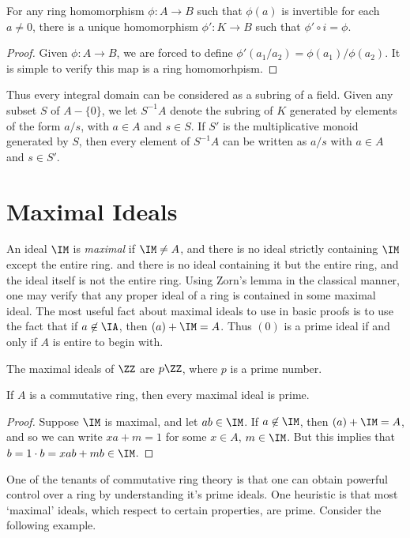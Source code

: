\begin{theorem}
    For any ring homomorphism $\phi: A \to B$ such that $\phi(a)$ is invertible for each $a \neq 0$, there is a unique homomorphism $\phi': K \to B$ such that $\phi' \circ i = \phi$.
\end{theorem}
\begin{proof}
    Given $\phi: A \to B$, we are forced to define $\phi'(a_1/a_2) = \phi(a_1) / \phi(a_2)$. It is simple to verify this map is a ring homomorhpism.
\end{proof}

Thus every integral domain can be considered as a subring of a field. Given any subset $S$ of $A - \{ 0 \}$, we let $S^{-1}A$ denote the subring of $K$ generated by elements of the form $a/s$, with $a \in A$ and $s \in S$. If $S'$ is the multiplicative monoid generated by $S$, then every element of $S^{-1}A$ can be written as $a/s$ with $a \in A$ and $s \in S'$.

\section{Maximal Ideals}

An ideal $\IM$ is \emph{maximal} if $\IM \neq A$, and there is no ideal strictly containing $\IM$ except the entire ring. and there is no ideal containing it but the entire ring, and the ideal itself is not the entire ring. Using Zorn's lemma in the classical manner, one may verify that any proper ideal of a ring is contained in some maximal ideal. The most useful fact about maximal ideals to use in basic proofs is to use the fact that if $a \not \in \IA$, then $(a) + \IM = A$. Thus $(0)$ is a prime ideal if and only if $A$ is entire to begin with.

\begin{example}
    The maximal ideals of $\ZZ$ are $p \ZZ$, where $p$ is a prime number.
\end{example}

\begin{theorem}
    If $A$ is a commutative ring, then every maximal ideal is prime.
\end{theorem}
\begin{proof}
    Suppose $\IM$ is maximal, and let $ab \in \IM$. If $a \not \in \IM$, then $(a) + \IM = A$, and so we can write $xa + m = 1$ for some $x \in A$, $m \in \IM$. But this implies that $b = 1 \cdot b = xab + mb \in \IM$.
\end{proof}

One of the tenants of commutative ring theory is that one can obtain powerful control over a ring by understanding it's prime ideals. One heuristic is that most `maximal' ideals, which respect to certain properties, are prime. Consider the following example.


